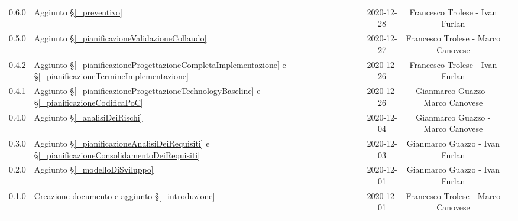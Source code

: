 \begin{center}
\begin{longtable}{|c|p{5cm}|c|c|c|}
		0.6.0 & Aggiunto \S\ref{_preventivo} & 2020-12-28 & Francesco Trolese - Ivan Furlan \\
		0.5.0 & Aggiunto \S\ref{_pianificazioneValidazioneCollaudo} & 2020-12-27 & Francesco Trolese - Marco Canovese \\
		0.4.2 & Aggiunto \S\ref{_pianificazioneProgettazioneCompletaImplementazione} e \S\ref{_pianificazioneTermineImplementazione} & 2020-12-26 & Francesco Trolese - Ivan Furlan \\
		0.4.1 & Aggiunto \S\ref{_pianificazioneProgettazioneTechnologyBaseline} e \S\ref{_pianificazioneCodificaPoC} & 2020-12-26 & Gianmarco Guazzo - Marco Canovese \\
		0.4.0 & Aggiunto \S\ref{_analisiDeiRischi} & 2020-12-04 & Gianmarco Guazzo - Marco Canovese \\
		0.3.0 & Aggiunto \S\ref{_pianificazioneAnalisiDeiRequisiti} e \S\ref{_pianificazioneConsolidamentoDeiRequisiti} & 2020-12-03 & Gianmarco Guazzo - Ivan Furlan \\
		0.2.0 & Aggiunto \S\ref{_modelloDiSviluppo} & 2020-12-01 & Gianmarco Guazzo - Ivan Furlan \\
		0.1.0 & Creazione documento e aggiunto \S\ref{_introduzione} & 2020-12-01 & Francesco Trolese - Marco Canovese \\
		\hline
	\end{longtable}
\end{center}